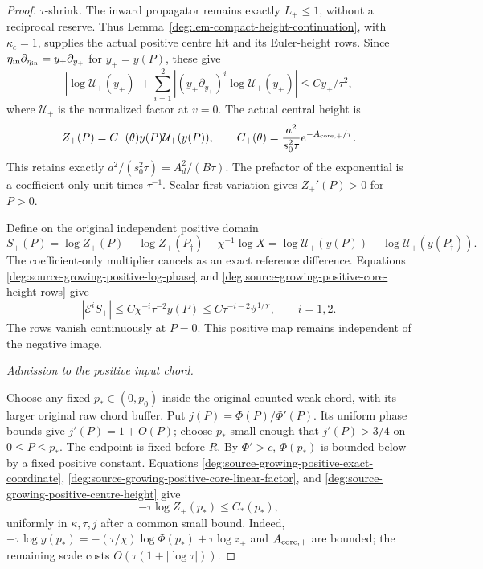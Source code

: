 \begin{proof}
\(\tau\)-shrink.
The inward propagator remains exactly \(L_+\le1\), without a
reciprocal reserve. Thus
Lemma~\ref{deg:lem-compact-height-continuation}, with
\(\kappa_c=1\), supplies the actual positive centre hit
and its Euler-height rows. Since
\(\eta_{\rm in}\partial_{\eta_{\rm in}}=y_+\partial_{y_+}\)
for \(y_+=y(P)\), these give
\begin{equation}
 |\log \mathcal U_+(y_+)|+
 \sum_{i=1}^2|(y_+\partial_{y_+})^i\log \mathcal U_+(y_+)|
                                      \le Cy_+/\tau^2 ,
 \label{deg:source-growing-positive-core-height-rows}
\end{equation}
where \(\mathcal U_+\) is the normalized factor at \(v=0\).
The actual central height is
\begin{equation}
 Z_+(P)=C_+(\theta)y(P)\mathcal U_+(y(P)),\qquad
 C_+(\theta)=\frac{a^2}{s_0^2\tau}
                                      e^{-A_{\rm core,+}/\tau}.
 \label{deg:source-growing-positive-centre-height}
\end{equation}
This retains exactly \(a^2/(s_0^2\tau)=A_d^2/(B\tau)\).
The prefactor of the exponential is a coefficient-only unit times
\(\tau^{-1}\).
Scalar first variation gives \(Z_+'(P)>0\) for \(P>0\).

Define on the original independent positive domain
\begin{equation}
 S_+(P)=\log Z_+(P)-\log Z_+(P_\dagger)-\chi^{-1}\log X
 =\log \mathcal U_+(y(P))-\log \mathcal U_+(y(P_\dagger)).
 \label{deg:source-growing-positive-source-remainder}
\end{equation}
The coefficient-only multiplier cancels as an exact reference
difference.  Equations \eqref{deg:source-growing-positive-log-phase} and \eqref{deg:source-growing-positive-core-height-rows} give
\begin{equation}
 |\mathcal E^iS_+|
 \le C\chi^{-i}\tau^{-2}y(P)
 \le C\tau^{-i-2}\vartheta^{1/\chi},\qquad i=1,2 .
 \label{deg:source-growing-positive-source-rows}
\end{equation}
The rows vanish continuously at $P=0$. This positive map remains
independent of the negative image.

\smallskip
\noindent\emph{Admission to the positive input chord.}

Choose any fixed \(p_*\in(0,p_0)\) inside the original counted
weak chord, with its larger original raw chord buffer.
Put \(j(P)=\Phi(P)/\Phi'(P)\).  Its uniform phase bounds give
\(j'(P)=1+O(P)\); choose \(p_*\) small enough that \(j'(P)>3/4\)
on \(0\le P\le p_*\).  The endpoint is fixed before \(R\).
By \(\Phi'>c\), \(\Phi(p_*)\) is bounded below by a fixed
positive constant.  Equations \eqref{deg:source-growing-positive-exact-coordinate}, \eqref{deg:source-growing-positive-core-linear-factor}, and \eqref{deg:source-growing-positive-centre-height} give
\begin{equation}
 -\tau\log Z_+(p_*)\le C_*(p_*) ,
 \label{deg:source-growing-positive-endpoint-action-budget}
\end{equation}
uniformly in \(\kappa,\tau,j\) after a common small bound.
Indeed, $-\tau\log y(p_*)=-(\tau/\chi)\log\Phi(p_*)
+\tau\log z_+$ and $A_{\rm core,+}$ are bounded; the remaining
scale costs $O(\tau(1+|\log\tau|))$.


\end{proof}
